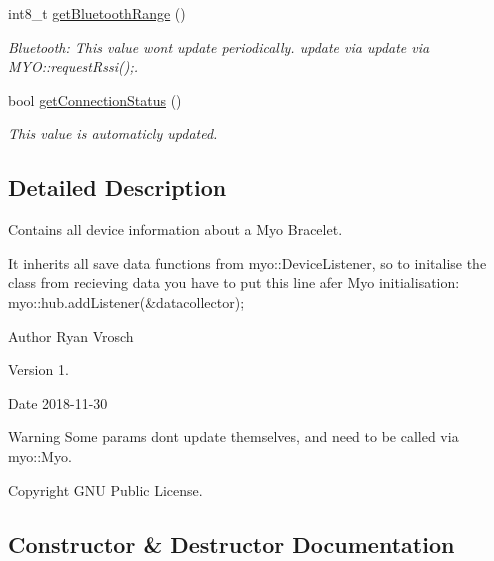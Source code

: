 \begin{DoxyCompactItemize}
int8\+\_\+t \mbox{\hyperlink{class_data_collector_a4992b2e777defed813c7ce15a73bc84b}{get\+Bluetooth\+Range}} ()
\begin{DoxyCompactList}\small\item\em Bluetooth\+: This value wont update periodically. update via update via M\+Y\+O\+::request\+Rssi();. \end{DoxyCompactList}\item 
bool \mbox{\hyperlink{class_data_collector_a2dbac95176fb77c1714573e41ba4490f}{get\+Connection\+Status}} ()
\begin{DoxyCompactList}\small\item\em This value is automaticly updated. \end{DoxyCompactList}\end{DoxyCompactItemize}


\subsection{Detailed Description}
Contains all device information about a Myo Bracelet. 

It inherits all save data functions from myo\+::\+Device\+Listener, so to initalise the class from recieving data you have to put this line afer Myo initialisation\+: myo\+::hub.\+add\+Listener(\&datacollector); \begin{DoxyAuthor}{Author}
Ryan Vrosch 
\end{DoxyAuthor}
\begin{DoxyVersion}{Version}
1. 
\end{DoxyVersion}
\begin{DoxyDate}{Date}
2018-\/11-\/30 
\end{DoxyDate}
\begin{DoxyWarning}{Warning}
Some params dont update themselves, and need to be called via myo\+::\+Myo. 
\end{DoxyWarning}
\begin{DoxyCopyright}{Copyright}
G\+NU Public License. 
\end{DoxyCopyright}


\subsection{Constructor \& Destructor Documentation}
\mbox{\label{class_data_collector_a6f7eccfdf026a83317c386a18d16397d}} 

